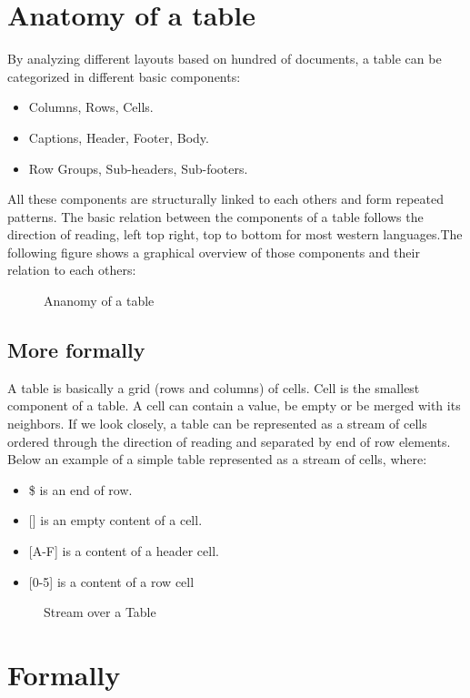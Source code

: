 \documentclass{article}
\begin{document}
\section{Anatomy of a table}
By analyzing different layouts based on hundred of documents, a table can be categorized in different basic components:
\begin{itemize}
    \item Columns, Rows, Cells.
    \item Captions, Header, Footer, Body.
    \item Row Groups, Sub-headers, Sub-footers.
\end{itemize}
All these components are structurally linked to each others and form repeated patterns. The basic relation between the
components of a table follows the direction of reading, left top right, top to bottom for most western languages.The
following figure shows a graphical overview of those components and their relation to each others:
\begin{figure}[H]
\caption{Ananomy of a table}

\end{figure}

\subsection{More formally}
A table is basically a grid (rows and columns) of cells. Cell is the smallest component of a table. A cell can contain a
value, be empty or be merged with its neighbors. If we look closely, a table can be represented as a stream of cells
ordered through the direction of reading and separated by end of row elements. Below an example of a simple table
represented as a stream of cells, where:
\begin{itemize}
    \item{\$} is an end of row.
    \item{[]} is an empty content of a cell.
    \item{[A-F]} is a content of a header cell.
    \item{[0-5]} is a content of a row cell
\end{itemize}
\begin{figure}[H]
\caption{Stream over a Table}

\end{figure}

\section{Formally}
\end{document}
